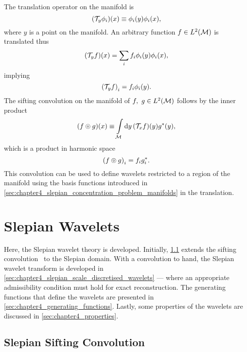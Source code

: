 The translation operator on the manifold is
%
\begin{equation}
	(\mathcal{T}_{y}\phi_{i})(x)
	\equiv \phi_{i}(y) \phi_{i}(x),
\end{equation}
%
where \(y\) is a point on the manifold.
An arbitrary function \(f \in L^{2}(\mathcal{M})\) is translated thus
%
\begin{equation}
	(\mathcal{T}_{y}f)(x)
	= \sum\limits_{i} f_{i} \phi_{i}(y) \phi_{i}(x),
\end{equation}
%
implying
%
\begin{equation}
	{(\mathcal{T}_{y}f)}_{i}
	= f_{i} \phi_{i}(y).
\end{equation}
%
The sifting convolution on the manifold of \(f,\ g \in L^{2}(\mathcal{M})\) follows by the inner product
%
\begin{equation}
	(f \circledcirc{} g)(x)
	\equiv \int\limits_{\mathcal{M}} \dd{y} (\mathcal{T}_{x}f)(y) g^{\ast}(y),
\end{equation}
%
which is a product in harmonic space
%
\begin{equation}
	{(f \circledcirc{} g)}_{i}
	= f_{i} g_{i}^{\ast}.
\end{equation}
%
This convolution can be used to define wavelets restricted to a region of the manifold using the basis functions introduced in \cref{sec:chapter4_slepian_concentration_problem_manifolds} in the translation.

\section{Slepian Wavelets}\label{sec:chapter4_slepian_wavelets}

Here, the Slepian wavelet theory is developed.
Initially, \cref{sec:chapter4_slepian_sifting_convolution} extends the sifting convolution~\cite{Roddy2021} to the Slepian domain.
With a convolution to hand, the Slepian wavelet transform is developed in \cref{sec:chapter4_slepian_scale_discretised_wavelets} --- where an appropriate admissibility condition must hold for exact reconstruction.
The generating functions that define the wavelets are presented in \cref{sec:chapter4_generating_functions}.
Lastly, some properties of the wavelets are discussed in \cref{sec:chapter4_properties}.

\subsection{Slepian Sifting Convolution}\label{sec:chapter4_slepian_sifting_convolution}

